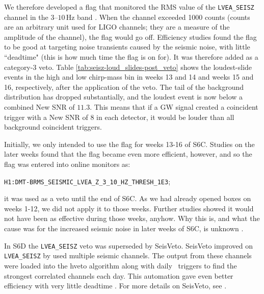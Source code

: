 We therefore developed a flag that monitored the RMS value of the
\verb|LVEA_SEISZ| channel in the $3$--$10\,$Hz band
\cite{detChar:LveaSeiszVeto}. When the channel exceeded 1000 counts (counts are
an arbitrary unit used for \ac{LIGO} channels; they are a measure of the
amplitude of the channel), the flag would go off. Efficiency studies found the
flag to be good at targeting noise transients caused by the seismic noise,
with little ``deadtime" (this is how much time the flag is on for). It was
therefore added as a category-3 veto. Table
\ref{tab:seisz-loud_slides-post_veto} shows the loudest-slide events in the
high and low chirp-mass bin in weeks 13 and 14 and weeks 15 and 16,
respectively, after the application of the veto. The tail of the background
distribution has dropped substantially, and the loudest event is now below a
combined New \ac{SNR} of $11.3$. This means that if a GW signal created a
coincident trigger with a New \ac{SNR} of $8$ in each detector, it would be
louder than all background coincident triggers.

Initially, we only intended to use the flag for weeks 13-16 of S6C. Studies on
the later weeks found that the flag became even more efficient, however, and so
the flag was entered into online monitors as:
\begin{center}
\verb|H1:DMT-BRMS_SEISMIC_LVEA_Z_3_10_HZ_THRESH_1E3|;
\end{center}
it was used as a veto until the end of S6C. As we had already opened boxes on
weeks 1-12, we did not apply it to those weeks. Further studies showed it would
not have been as effective during those weeks, anyhow. Why this is, and what
the cause was for the increased seismic noise in later weeks of S6C, is unknown
\cite{Lundgren:personal-comm}.

In S6D the \verb|LVEA_SEISZ| veto was superseded by SeisVeto. SeisVeto improved
on \verb|LVEA_SEISZ| by used multiple seismic channels. The output from these
channels were loaded into the hveto algorithm along with daily \ihope~triggers
to find the strongest correlated channels each day. This automation gave even
better efficiency with very little deadtime \cite{detChar:SeisVeto}. For more
details on SeisVeto, see \cite{Macleod:2011}.

